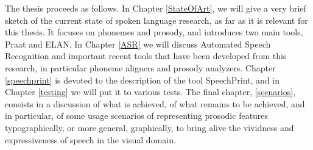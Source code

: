 The thesis proceeds as follows. In Chapter \ref{StateOfArt}, we will give a very brief sketch of the current state of spoken language research, as far as it is relevant for this thesis. It focuses on phonemes and prosody, and introduces two main tools, Praat and ELAN. In Chapter \ref{ASR} we will discuss Automated Speech Recognition and important recent tools that have been developed from this research, in particular phoneme aligners and prosody analyzers. Chapter \ref{speechprint} is devoted to the description of the tool SpeechPrint, and in Chapter \ref{testing} we will put it to various tests. The final chapter, \ref{scenarios}, consists in a discussion of what is achieved, of what remains to be achieved, and in particular, of some usage scenarios of representing prosodic features typographically, or more general, graphically, to bring alive the vividness and expressiveness of speech in the visual domain. 






